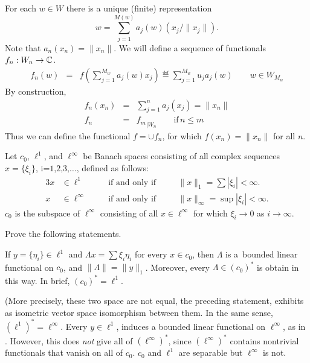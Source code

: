 \begin{enumerate}
\begin{itemize}
 For each \(w\in W\) there is a unique (finite) representation
 \[ w = \sum_{j=1}^{M(w)} a_j(w) (x_j/\|x_j\|).  \]
 Note that \(a_n(x_n) = \|x_n\|\).
 We will define a sequence of functionals \(f_n: W_n \to \mathbb{C}\).
 \begin{eqnarray*}
 f_n(w) &=& f\left(\sum_{j=1}^{M_w} a_j(w) x_j\right) 
       \eqdef \sum_{j=1}^{M_w} u_j a_j(w) \qquad w \in W_{M_w}
 \end{eqnarray*}
 By construction, 
 \begin{eqnarray*}
  f_n(x_n) &=& \sum_{j=1}^n a_j(x_j) = \|x_n\| \\
  f_n &=& {f_m}_{|W_n}  \qquad \textrm{if}\, n\leq m
 \end{eqnarray*}
 Thus we can define the functional \(f = \cup f_n\), 
 for which \(f(x_n) = \|x_n\|\) for all $n$.
\end{itemize}


\begin{excopy}
Let \(c_0\), \(\ell^1\), and \(\ell^\infty\) be Banach spaces consisting
of all complex sequences \(x=\{\xi_i\}\), \(\mbox{i=1,2,3,\ldots,}\) 
defined as follows:
\begin{alignat*}{3}
x&\in\ell^1 & &\quad\textrm{if and only if} 
   \quad && \|x\|_1 = \sum|\xi_i|<\infty.\\
x&\in\ell^\infty && \quad\textrm{if and only if} 
   \quad && \|x\|_\infty = \sup |\xi_i|<\infty.
\end{alignat*}
\(c_0\) is the subspace of \(\ell^\infty\) consisting of all \(x\in\ell^\infty\)
for which \(\xi_i \to 0\) as \(i\to\infty\).

Prove the following statements.
\begin{itemize}
  If \(y=\{\eta_i\}\in \ell^1\) and \(\Lambda x = \sum \xi_i\eta_i\)
            for every \(x\in c_0\), then \(\Lambda\)
            is a~bounded linear functional on \(c_0\),
            and \(\|\Lambda\| = \|y\|_1\).
            Moreover, every \(\Lambda \in (c_0)^*\) is obtain in this way.
            In brief, \((c_0)^* = \ell^1\).

            (More precisely, these two space are not equal, the preceding
            statement, exhibits as isometric vector space isomorphism
            between them.
  In the same sense, \((\ell^1)^* = \ell^\infty\).
  Every \(y\in \ell^1\), induces a bounded linear functional on
            \(\ell^\infty\), as in .
            However, this does \emph{not} give all of \((\ell^\infty)^*\),
            since \((\ell^\infty)^*\) contains nontrivial functionals that
            vanish on all of \(c_0\).
  \(c_0\) and \(\ell^1\) are separable but \(\ell^\infty\) is not.
\end{itemize}
\end{excopy}


\end{enumerate}
